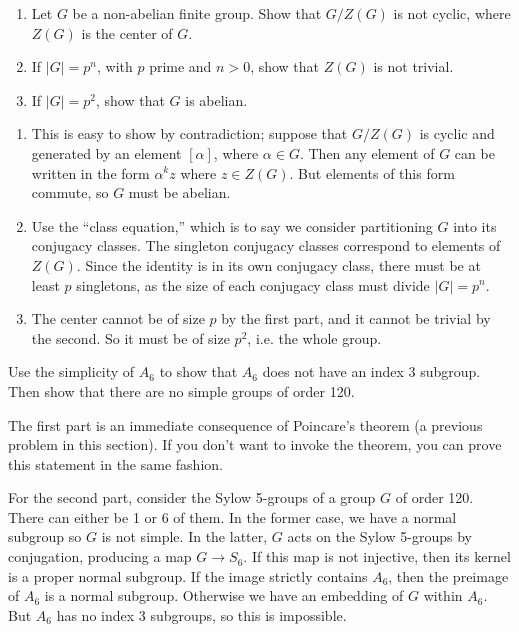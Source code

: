 \begin{problem}\hfill
	\begin{enumerate}
		\item Let $G$ be a non-abelian finite group. Show that $G/Z(G)$ is not cyclic, where $Z(G)$ is the center of $G$.
		\item If $|G| = p^n$, with $p$ prime and $n > 0$, show that $Z(G)$ is not trivial.
		\item If $|G| = p^2$, show that $G$ is abelian.
	\end{enumerate}
\end{problem}
\begin{solution}\hfill
	\begin{enumerate}
		\item This is easy to show by contradiction; suppose that $G/Z(G)$ is cyclic and generated by an element $[\alpha]$, where $\alpha \in G$. Then any element of $G$ can be written in the form $\alpha^k z$ where $z\in Z(G)$. But elements of this form commute, so $G$ must be abelian.
		\item Use the ``class equation,'' which is to say we consider partitioning $G$ into its conjugacy classes. The singleton conjugacy classes correspond to elements of $Z(G)$. Since the identity is in its own conjugacy class, there must be at least $p$ singletons, as the size of each conjugacy class must divide $|G| = p^n$.
		\item The center cannot be of size $p$ by the first part, and it cannot be trivial by the second. So it must be of size $p^2$, i.e. the whole group.
	\end{enumerate}
\end{solution}

\begin{problem}
	Use the simplicity of $A_6$ to show that $A_6$ does not have an index 3 subgroup. Then show that there are no simple groups of order 120.
\end{problem}
\begin{solution}
	The first part is an immediate consequence of Poincare's theorem (a previous problem in this section). If you don't want to invoke the theorem, you can prove this statement in the same fashion.
	
	For the second part, consider the Sylow 5-groups of a group $G$ of order 120. There can either be 1 or 6 of them. In the former case, we have a normal subgroup so $G$ is not simple. In the latter, $G$ acts on the Sylow 5-groups by conjugation, producing a map $G \to S_6$. If this map is not injective, then its kernel is a proper normal subgroup. If the image strictly contains $A_6$, then the preimage of $A_6$ is a normal subgroup. Otherwise we have an embedding of $G$ within $A_6$. But $A_6$ has no index 3 subgroups, so this is impossible.
\end{solution}